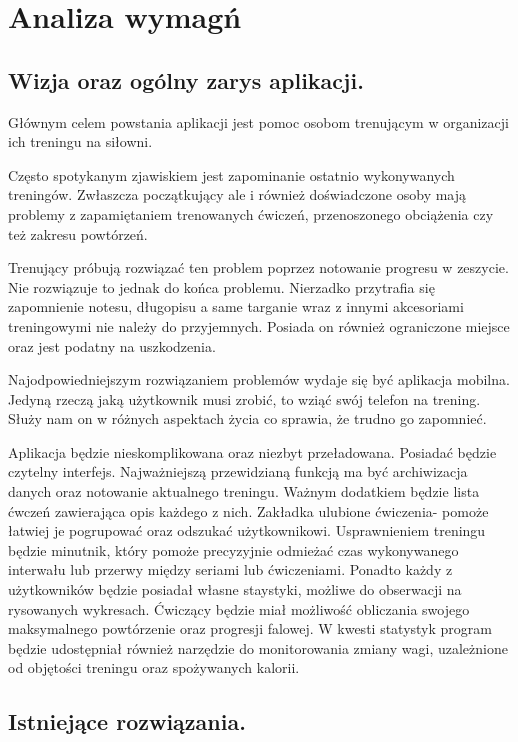 \chapter[Analiza wymagań.]{Analiza wymagń}

\section{Wizja oraz ogólny zarys aplikacji.}
Głównym celem powstania aplikacji jest pomoc osobom trenującym w organizacji ich treningu na siłowni. 

Często spotykanym zjawiskiem jest zapominanie ostatnio wykonywanych treningów. Zwłaszcza początkujący ale i również doświadczone osoby mają problemy z zapamiętaniem trenowanych ćwiczeń, przenoszonego obciążenia czy też zakresu powtórzeń.

Trenujący próbują rozwiązać ten problem poprzez notowanie progresu w zeszycie.
Nie rozwiązuje to jednak do końca problemu. Nierzadko przytrafia się zapomnienie notesu, długopisu a same targanie wraz z innymi akcesoriami treningowymi nie należy do przyjemnych. Posiada on również ograniczone miejsce oraz jest podatny na uszkodzenia.

Najodpowiedniejszym rozwiązaniem problemów wydaje się być aplikacja mobilna. Jedyną rzeczą jaką użytkownik musi zrobić, to wziąć swój telefon na trening. Służy nam on w różnych aspektach życia co sprawia, że trudno go zapomnieć.

Aplikacja będzie nieskomplikowana oraz niezbyt przeładowana. Posiadać będzie czytelny interfejs. Najważniejszą przewidzianą funkcją ma być archiwizacja danych oraz notowanie aktualnego treningu. Ważnym dodatkiem będzie lista ćwczeń zawierająca opis każdego z nich. Zakładka ulubione ćwiczenia- pomoże łatwiej je pogrupować oraz odszukać użytkownikowi. Usprawnieniem treningu będzie minutnik, który pomoże precyzyjnie odmieżać czas wykonywanego interwału lub przerwy między seriami lub ćwiczeniami. Ponadto każdy z użytkowników będzie posiadał własne staystyki, możliwe do obserwacji na rysowanych wykresach. Ćwiczący będzie miał możliwość obliczania swojego maksymalnego powtórzenie oraz progresji falowej. W kwesti statystyk program będzie udostępniał również narzędzie do monitorowania zmiany wagi, uzależnione od objętości treningu oraz spożywanych kalorii.

\section{Istniejące rozwiązania.}

